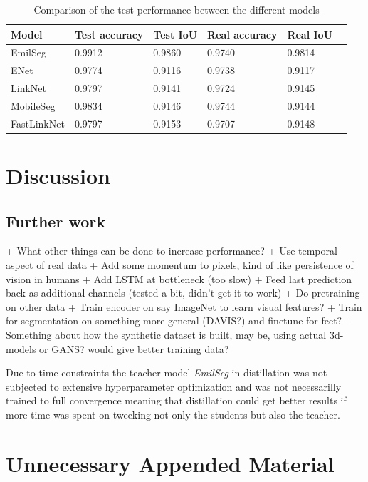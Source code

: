 \documentclass{kththesis}
\begin{document}
\begin{table}[]
\centering
\caption{Comparison of the test performance between the different models}
\label{tab:res_performance}
\begin{tabular}{@{}llllll@{}}
\toprule
Model       & Test accuracy & Test IoU & Real accuracy & Real IoU \\ \midrule
EmilSeg    & 0.9912 & 0.9860 & 0.9740 & 0.9814 \\
ENet       & 0.9774 & 0.9116 & 0.9738 & 0.9117 \\
LinkNet    & 0.9797 & 0.9141 & 0.9724 & 0.9145 \\
MobileSeg  & 0.9834 & 0.9146 & 0.9744 & 0.9144 \\ 
FastLinkNet& 0.9797 & 0.9153 & 0.9707 & 0.9148 \\  \bottomrule
\end{tabular}
\end{table}

\chapter{Discussion}

\section{Further work}
+ What other things can be done to increase performance?
  + Use temporal aspect of real data
    + Add some momentum to pixels, kind of like persistence of vision in humans 
    + Add LSTM at bottleneck (too slow)
    + Feed last prediction back as additional channels (tested a bit, didn't get it to work)
  + Do pretraining on other data
    + Train encoder on say ImageNet to learn visual features?
    + Train for segmentation on something more general (DAVIS?) and finetune for feet?
    + Something about how the synthetic dataset is built, may be, using actual
    3d-models or GANS? would give better training data?
    
    Due to time constraints the teacher model \textit{EmilSeg} in distillation
    was not subjected to extensive hyperparameter optimization and was not
    necessarilly trained to full convergence meaning that distillation could get
    better results if more time was spent on tweeking not only the students but
    also the teacher.
    

\printbibliography[heading=bibintoc]%

\appendix

\chapter{Unnecessary Appended Material}
\end{document}

